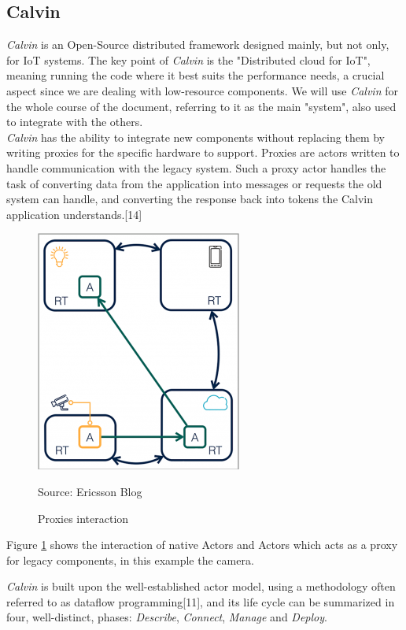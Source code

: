 \begin{itemize}
\section{Calvin}
  \textit{Calvin} is an Open-Source distributed framework designed mainly, but not only,
  for IoT systems. The key point of \textit{Calvin} is the "Distributed cloud for IoT", meaning
  running the code where it best suits the performance needs, a crucial aspect since we are
  dealing with low-resource components. We will use \textit{Calvin} for the whole course of the document,
  referring to it as the main "system", also used to integrate with the others. \\
  \textit{Calvin} has the ability to integrate new components without replacing them by writing
  proxies for the specific hardware to support. Proxies are actors written to handle
  communication with the legacy system. Such a proxy actor handles the task of converting data
  from the application into messages or requests the old system can handle, and converting the
  response back into tokens the Calvin application understands.[14]

        \begin{figure}[h]
        \caption{Proxies interaction}

        \label{fig:calvinproxy}
        \centering
        \includegraphics[scale=0.75]{calvin4.png}
        \par{Source: Ericsson Blog}
        \end{figure}
  Figure \ref{fig:calvinproxy} shows the interaction of native Actors and Actors which
  acts as a proxy for legacy components, in this example the camera.




  \textit{Calvin} is built upon the well-established actor model, using a methodology often referred to as dataflow programming[11], and
  its life cycle can be summarized in four, well-distinct, phases: \textit{Describe}, \textit{Connect}, \textit{Manage}
  and \textit{Deploy}.


\end{itemize}
